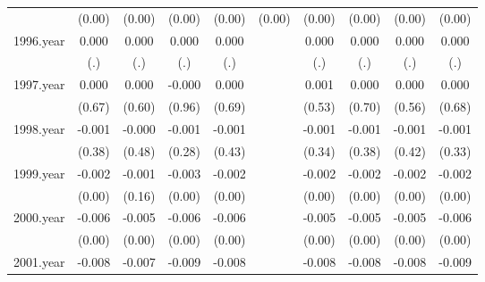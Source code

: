 {\begin{tabular}{l*{9}{c}}
          &   (0.00)         &   (0.00)         &   (0.00)         &   (0.00)         &   (0.00)         &   (0.00)         &   (0.00)         &   (0.00)         &   (0.00)         \\
[1em]
1996.year &    0.000         &    0.000         &    0.000         &    0.000         &                  &    0.000         &    0.000         &    0.000         &    0.000         \\
          &      (.)         &      (.)         &      (.)         &      (.)         &                  &      (.)         &      (.)         &      (.)         &      (.)         \\
[1em]
1997.year &    0.000         &    0.000         &   -0.000         &    0.000         &                  &    0.001         &    0.000         &    0.000         &    0.000         \\
          &   (0.67)         &   (0.60)         &   (0.96)         &   (0.69)         &                  &   (0.53)         &   (0.70)         &   (0.56)         &   (0.68)         \\
[1em]
1998.year &   -0.001         &   -0.000         &   -0.001         &   -0.001         &                  &   -0.001         &   -0.001         &   -0.001         &   -0.001         \\
          &   (0.38)         &   (0.48)         &   (0.28)         &   (0.43)         &                  &   (0.34)         &   (0.38)         &   (0.42)         &   (0.33)         \\
[1em]
1999.year &   -0.002\sym{***}&   -0.001         &   -0.003\sym{***}&   -0.002\sym{***}&                  &   -0.002\sym{***}&   -0.002\sym{***}&   -0.002\sym{***}&   -0.002\sym{***}\\
          &   (0.00)         &   (0.16)         &   (0.00)         &   (0.00)         &                  &   (0.00)         &   (0.00)         &   (0.00)         &   (0.00)         \\
[1em]
2000.year &   -0.006\sym{***}&   -0.005\sym{***}&   -0.006\sym{***}&   -0.006\sym{***}&                  &   -0.005\sym{***}&   -0.005\sym{***}&   -0.005\sym{***}&   -0.006\sym{***}\\
          &   (0.00)         &   (0.00)         &   (0.00)         &   (0.00)         &                  &   (0.00)         &   (0.00)         &   (0.00)         &   (0.00)         \\
[1em]
2001.year &   -0.008\sym{***}&   -0.007\sym{*}  &   -0.009\sym{***}&   -0.008\sym{***}&                  &   -0.008\sym{***}&   -0.008\sym{***}&   -0.008\sym{***}&   -0.009\sym{***}\\

\end{tabular}}
